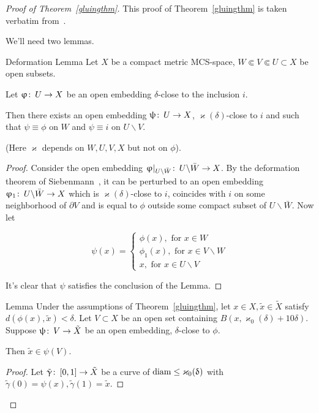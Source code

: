 \begin{proof}[Proof of Theorem~\ref{gluingthm}]
This proof of Theorem~\ref{gluingthm} is taken verbatim from~\cite{Per}.


We'll need two lemmas.

\begin{thm}{Deformation Lemma}\label{deflem}
Let $X$ be a compact metric MCS-space,  $W\Subset V\Subset U\subset X$ be open subsets.

Let $\phi\co U\to X$ be an open embedding $\delta$-close to the inclusion $i$.

Then there exists an open embedding $\psi\co U\to X$, $\varkappa(\delta)$-close to $i$ and such that  $\psi\equiv\phi$ on $W$ and $\psi\equiv i$ on $U\backslash V$.

(Here $\varkappa$ depends on $W,U,V,X$ but not on $\phi$).
\end{thm}
\begin{proof}
Consider the open embedding $\phi |_{U\backslash \bar{W}}\co U\backslash \bar{W}\to X$. By the deformation theorem of Siebenmann~\cite[Theorem 5.4]{Sieb},  it can be perturbed to an open embedding $\phi_1\co U\backslash \bar{W}\to X$ which is $\varkappa(\delta)$-close to $i$,  coincides with $i$ on some neighborhood of $\partial V$ and is equal to $\phi$ outside some compact subset of  $U\backslash \bar{W}$. Now let

\[
\psi(x)=
\begin{cases}
\phi(x),\text{ for } x\in W\\
\phi_1(x), \text{ for } x\in V\backslash W\\
x, \text{ for } x\in U\backslash V
\end{cases}
\]

It's clear that $\psi$ satisfies the conclusion of the Lemma.

\end{proof}
\begin{thm}{Lemma}\label{ontolem}
Under the assumptions of Theorem~\ref{gluingthm},  let $x\in X, \tilde{x}\in\tilde{X}$ satisfy $d(\phi(x),\tilde{x})<\delta$. Let $V\subset X$ be an open set containing $B(x,\varkappa_0(\delta)+10\delta)$.
Suppose $\psi\co V\to\tilde{X}$ be an open embedding, $\delta$-close to $\phi$.

Then $\tilde{x}\in \psi(V)$.

\end{thm}
\begin{proof}
Let $\tilde{\gamma}\co [0,1]\to \tilde{X}$ be a curve of $\diam\le \varkappa_0(\delta)$ with $\tilde{\gamma}(0)=\psi(x),\tilde{ \gamma}(1)=\tilde{x}$.


\end{proof}
\end{proof}
